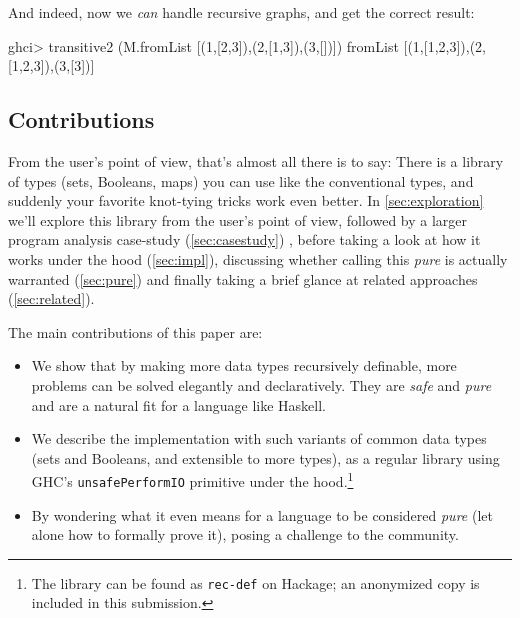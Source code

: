 \documentclass[manuscript,anonymous,screen,acmsmall]{acmart}
\begin{document}
And indeed, now we \emph{can} handle recursive graphs, and get the correct result:
\begin{code}
ghci> transitive2 (M.fromList [(1,[2,3]),(2,[1,3]),(3,[])])
fromList [(1,[1,2,3]),(2,[1,2,3]),(3,[3])]
\end{code}

\subsection{Contributions}

From the user’s point of view, that’s almost all there is  to say: There is a library of types (sets, Booleans, maps) you can use like the conventional types, and suddenly your favorite knot-tying tricks work even better. In \cref{sec:exploration} we'll explore this library from the user's point of view, followed by a larger program analysis case-study (\cref{sec:casestudy}) , before taking a look at how it works under the hood (\cref{sec:impl}), discussing whether calling this \emph{pure} is actually warranted (\cref{sec:pure}) and finally taking a brief glance at related approaches (\cref{sec:related}).

\medskip

The main contributions of this paper are:

\begin{itemize}
\item We show that by making more data types recursively definable, more problems can be solved elegantly and declaratively. They are \emph{safe} and \emph{pure} and are a natural fit for a language like Haskell.

\item We describe the implementation with such variants of common data types (sets and Booleans, and extensible to more types), as a regular library using GHC's \verb|unsafePerformIO| primitive under the hood.\footnote{The library can be found as \texttt{rec-def} on Hackage; an anonymized copy is included in this submission.}

\item By wondering what it even means for a language to be considered \emph{pure} (let alone how to formally prove it), posing a challenge to the community.

\end{itemize}
\end{document}
